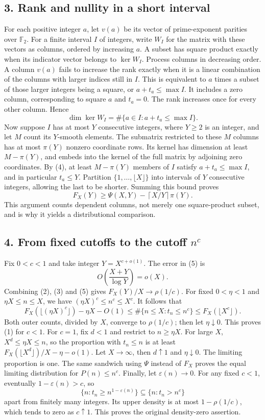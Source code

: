 \subsection*{3. Rank and nullity in a short interval}
For each positive integer $a$, let $v(a)$ be its vector of prime-exponent parities over $\mathbb F_2$. For a finite interval $I$ of integers, write $W_I$ for the matrix with these vectors as columns, ordered by increasing $a$. A subset has square product exactly when its indicator vector belongs to $\ker W_I$.
Process columns in decreasing order. A column $v(a)$ fails to increase the rank exactly when it is a linear combination of the columns with larger indices still in $I$. This is equivalent to $a$ times a subset of those larger integers being a square, or $a+t_a\le\max I$. It includes a zero column, corresponding to square $a$ and $t_a=0$. The rank increases once for every other column. Hence
\[
 \dim\ker W_I=\#\{a\in I:a+t_a\le\max I\}.              \tag{4}
\]
Now suppose $I$ has at most $Y$ consecutive integers, where $Y\ge2$ is an integer, and let $M$ count its $Y$-smooth elements. The submatrix restricted to these $M$ columns has at most $\pi(Y)$ nonzero coordinate rows. Its kernel has dimension at least $M-\pi(Y)$, and embeds into the kernel of the full matrix by adjoining zero coordinates. By (4), at least $M-\pi(Y)$ members of $I$ satisfy $a+t_a\le\max I$, and in particular $t_a\le Y$.
Partition $\{1,\ldots,\lfloor X\rfloor\}$ into intervals of $Y$ consecutive integers, allowing the last to be shorter. Summing this bound proves
\[
 F_X(Y)\ge\Psi(X,Y)-\left\lceil X/Y\right\rceil\pi(Y).    \tag{5}
\]
This argument counts dependent columns, not merely one square-product subset, and is why it yields a distributional comparison.
\subsection*{4. From fixed cutoffs to the cutoff $n^c$}
Fix $0<c<1$ and take integer $Y=X^{c+o(1)}$. The error in (5) is
\[
 O\left(\frac{X+Y}{\log Y}\right)=o(X).
\]
Combining (2), (3) and (5) gives $F_X(Y)/X\to\rho(1/c)$.
For fixed $0<\eta<1$ and $\eta X\le n\le X$, we have $(\eta X)^c\le n^c\le X^c$. It follows that
\[
 F_X(\lfloor(\eta X)^c\rfloor)-\eta X-O(1)
 \le\#\{n\le X:t_n\le n^c\}\le F_X(\lfloor X^c\rfloor).
\]
Both outer counts, divided by $X$, converge to $\rho(1/c)$; then let $\eta\downarrow0$. This proves (1) for $c<1$.
For $c=1$, fix $d<1$ and restrict to $n\ge\eta X$. For large $X$, $X^d\le\eta X\le n$, so the proportion with $t_n\le n$ is at least $F_X(\lfloor X^d\rfloor)/X-\eta-o(1)$. Let $X\to\infty$, then $d\uparrow1$ and $\eta\downarrow0$. The limiting proportion is one. The same sandwich using $\Psi$ instead of $F_X$ proves the equal limiting distribution for $P(n)\le n^c$.
Finally, let $\varepsilon(n)\to0$. For any fixed $c<1$, eventually $1-\varepsilon(n)>c$, so
\[
 \{n:t_n\ge n^{1-\varepsilon(n)}\}\subseteq\{n:t_n>n^c\}
\]
apart from finitely many integers. Its upper density is at most $1-\rho(1/c)$, which tends to zero as $c\uparrow1$. This proves the original density-zero assertion.
